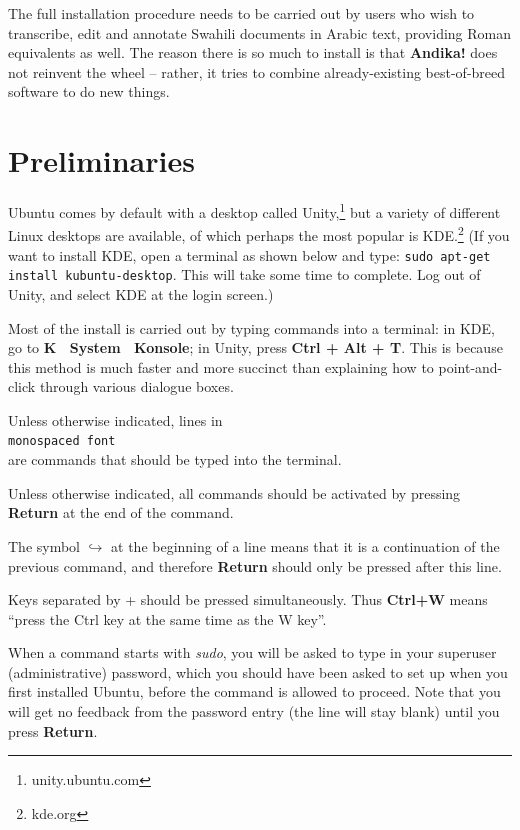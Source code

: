 \documentclass[a4paper,10pt, oneside]{book}
\begin{document}
The full installation procedure needs to be carried out by users who wish to transcribe, edit and annotate Swahili documents in Arabic text, providing Roman equivalents as well.  The reason there is so much to install is that \textbf{Andika!} does not reinvent the wheel -- rather, it tries to combine already-existing best-of-breed software to do new things.


\section{Preliminaries}

Ubuntu comes by default with a desktop called Unity,\footnote{unity.ubuntu.com} but a variety of different Linux desktops are available, of which perhaps the most popular is KDE.\footnote{kde.org}  (If you want to install KDE, open a terminal as shown below and type: \verb|sudo apt-get install kubuntu-desktop|.  This will take some time to complete.  Log out of Unity, and select KDE at the login screen.)

Most of the install is carried out by typing commands into a terminal: in KDE, go to \textbf{K \textrightarrow\ System \textrightarrow\ Konsole}; in Unity, press \textbf{Ctrl + Alt + T}.  This is because this method is much faster and more succinct than explaining how to point-and-click through various dialogue boxes.

Unless otherwise indicated, lines in\\
\texttt{monospaced font}\\
are commands that should be typed into the terminal.  

Unless otherwise indicated, all commands should be activated by pressing \textbf{Return} at the end of the command.

The symbol $\hookrightarrow$ at the beginning of a line means that it is a continuation of the previous command, and therefore \textbf{Return} should only be pressed after this line.

Keys separated by + should be pressed simultaneously.  Thus \textbf{Ctrl+W} means ``press the Ctrl key at the same time as the W key''.

When a command starts with \textit{sudo}, you will be asked to type in your superuser (administrative) password, which you should have been asked to set up when you first installed Ubuntu, before the command is allowed to proceed.  Note that you will get no feedback from the password entry (the line will stay blank) until you press \textbf{Return}.
\end{document}
